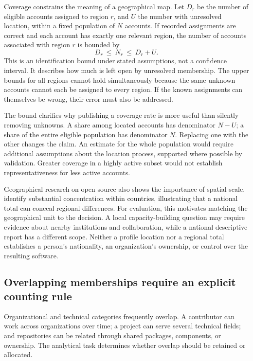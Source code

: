 

Coverage constrains the meaning of a geographical map. Let \(D_r\) be the number of eligible accounts assigned to region \(r\), and \(U\) the number with unresolved location, within a fixed population of \(N\) accounts. If recorded assignments are correct and each account has exactly one relevant region, the number of accounts associated with region \(r\) is bounded by
\begin{equation}
 D_r\ \leq\ N_r\ \leq\ D_r+U.
 \label{eq:ch9-geography}
\end{equation}
This is an identification bound under stated assumptions, not a confidence interval. It describes how much is left open by unresolved membership. The upper bounds for all regions cannot hold simultaneously because the same unknown accounts cannot each be assigned to every region. If the known assignments can themselves be wrong, their error must also be addressed.

The bound clarifies why publishing a coverage rate is more useful than silently removing unknowns. A share among located accounts has denominator \(N-U\); a share of the entire eligible population has denominator \(N\). Replacing one with the other changes the claim. An estimate for the whole population would require additional assumptions about the location process, supported where possible by validation. Greater coverage in a highly active subset would not establish representativeness for less active accounts.

Geographical research on open source also shows the importance of spatial scale. \citet{wachs2022} identify substantial concentration within countries, illustrating that a national total can conceal regional differences. For evaluation, this motivates matching the geographical unit to the decision. A local capacity-building question may require evidence about nearby institutions and collaboration, while a national descriptive report has a different scope. Neither a profile location nor a regional total establishes a person's nationality, an organization's ownership, or control over the resulting software.

\subsection{Overlapping memberships require an explicit counting rule}
Organizational and technical categories frequently overlap. A contributor can work across organizations over time; a project can serve several technical fields; and repositories can be related through shared packages, components, or ownership. The analytical task determines whether overlap should be retained or allocated.

